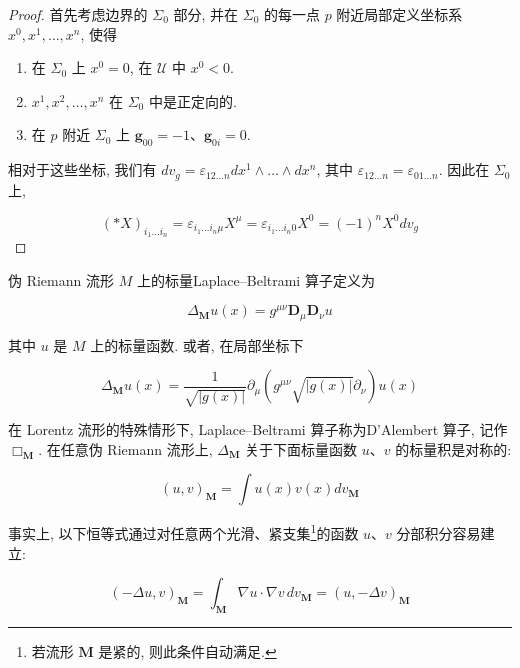 \begin{proof}
首先考虑边界的 $\Sigma_{0}$ 部分, 并在 $\Sigma_{0}$ 的每一点 $p$ 附近局部定义坐标系 $x^{0}, x^{1}, \ldots, x^{n}$, 使得

\begin{enumerate}
\renewcommand{\labelenumi}{(\arabic{enumi})}
\item 在 $\Sigma_0$ 上 $x^0 = 0$, 在 $\mathcal{U}$ 中 $x^0 < 0$.
\item $x^{1}, x^{2}, \ldots, x^{n}$ 在 $\Sigma_{0}$ 中是正定向的.
\item 在 $p$ 附近 $\Sigma_0$ 上 $\mathbf{g}_{00} = -1$、$\mathbf{g}_{0i} = 0$.
\end{enumerate}

相对于这些坐标, 我们有 $dv_{g} = \varepsilon_{12\ldots n}dx^{1} \wedge \ldots \wedge dx^{n}$, 其中 $\varepsilon_{12\ldots n} = \varepsilon_{01\ldots n}$. 因此在 $\Sigma_{0}$ 上,

\[
(\ast X)_{i_{1}\dots i_{n}} = \varepsilon_{i_{1}\dots i_{n}\mu}X^{\mu} = \varepsilon_{i_{1}\dots i_{n}0}X^{0} = (-1)^{n}X^{0}dv_{g}
\]
\end{proof}


伪 Riemann 流形 $M$ 上的标量Laplace--Beltrami 算子定义为

\begin{equation}
\Delta_{\mathbf{M}}u(x) = g^{\mu\nu}\mathbf{D}_{\mu}\mathbf{D}_{\nu}u\label{eq:cA-426}
\end{equation}

其中 $u$ 是 $M$ 上的标量函数. 或者, 在局部坐标下

\begin{equation}
\Delta_{\mathbf{M}}u(x) = \frac{1}{\sqrt{|g(x)|}}\partial_{\mu}(g^{\mu\nu}\sqrt{|g(x)|}\partial_{\nu})u(x)\label{eq:cA-427}
\end{equation}

在 Lorentz 流形的特殊情形下, Laplace--Beltrami 算子称为D'Alembert 算子, 记作 $\Box_{\mathbf{M}}$. 在任意伪 Riemann 流形上, $\Delta_{\mathbf{M}}$ 关于下面标量函数 $u$、$v$ 的标量积是对称的:

\[
(u, v)_{\mathbf{M}} = \int u(x)v(x)dv_{\mathbf{M}}
\]

事实上, 以下恒等式通过对任意两个光滑、紧支集\footnote{若流形 $\mathbf{M}$ 是紧的, 则此条件自动满足.}的函数 $u$、$v$ 分部积分容易建立:

\begin{equation}
(-\Delta u, v)_{\mathbf{M}} = \int_{\mathbf{M}}\nabla u \cdot \nabla v\, dv_{\mathbf{M}} = (u, -\Delta v)_{\mathbf{M}}\label{eq:cA-428}
\end{equation}

